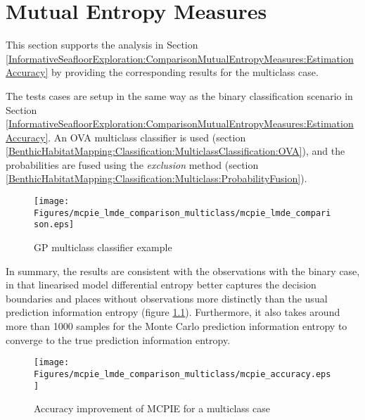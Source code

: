 \chapter{Mutual Entropy Measures}
\label{Appendix:MutualEntropyMeasures}

	This section supports the analysis in Section \ref{InformativeSeafloorExploration:ComparisonMutualEntropyMeasures:EstimationAccuracy} by providing the corresponding results for the multiclass case.
	
	The tests cases are setup in the same way as the binary classification scenario in Section \ref{InformativeSeafloorExploration:ComparisonMutualEntropyMeasures:EstimationAccuracy}. An OVA multiclass classifier is used (section \ref{BenthicHabitatMapping:Classification:MulticlassClassification:OVA}), and the probabilities are fused using the \textit{exclusion} method (section  \ref{BenthicHabitatMapping:Classification:Multiclass:ProbabilityFusion}).

	\begin{figure}[!htbp]
		\centering
			\texttt{[image: Figures/mcpie\_lmde\_comparison\_multiclass/mcpie\_lmde\_comparison.eps]}
		\caption{GP multiclass classifier example}
		\label{Figure:mcpie_lmde_comparison_multiclass}
	\end{figure}
		
	In summary, the results are consistent with the observations with the binary case, in that linearised model differential entropy better captures the decision boundaries and places without observations more distinctly than the usual prediction information entropy (figure \ref{Figure:mcpie_lmde_comparison_multiclass}). Furthermore, it also takes around more than 1000 samples for the Monte Carlo prediction information entropy to converge to the true prediction information entropy.
	
	\begin{figure}[!htbp]
		\centering
			\texttt{[image: Figures/mcpie\_lmde\_comparison\_multiclass/mcpie\_accuracy.eps]}
		\caption{Accuracy improvement of MCPIE for a multiclass case}
		\label{Figure:mcpie_accuracy_multiclass}
	\end{figure}